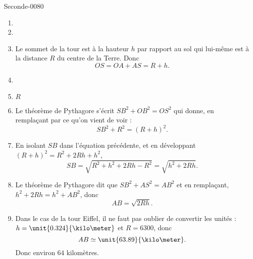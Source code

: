 
\begin{corrige}{Seconde-0080}


    \begin{enumerate}
        \item
        \item
        \item
            Le sommet de la tour est à la hauteur \( h\) par rapport au sol qui lui-même est à la distance \( R\) du centre de la Terre. Donc
            \begin{equation}
                OS=OA+AS=R+h.
            \end{equation}
        \item
        \item
            \( R\)
        \item
            Le théorème de Pythagore s'écrit \( SB^2+OB^2=OS^2\) qui donne, en remplaçant par ce qu'on vient de voir :
            \begin{equation}
                SB^2+R^2=(R+h)^2.
            \end{equation}
        \item
            En isolant \( SB\) dans l'équation précédente, et en développant \( (R+h)^2=R^2+2Rh+h^2\),
            \begin{equation}
                SB=\sqrt{R^2+h^2+2Rh-R^2}=\sqrt{h^2+2Rh}.
            \end{equation}
        \item
            Le théorème de Pythagore dit que \( SB^2+AS^2=AB^2\) et en remplaçant, \( h^2+2Rh=h^2+AB^2\), donc
            \begin{equation}
                AB=\sqrt{2Rh}.
            \end{equation}
        \item
            Dans le cas de la tour Eiffel, il ne faut pas oublier de convertir les unités : \( h=\unit{0.324}{\kilo\meter}\) et \( R=6300\), donc
            \begin{equation}
                AB\simeq\unit{63.89}{\kilo\meter}.
            \end{equation}
            Donc environ \( 64\) kilomètres.
    \end{enumerate}

\end{corrige}
